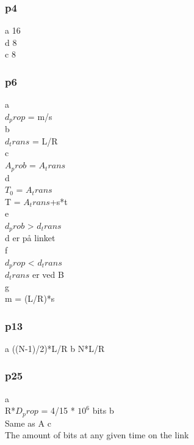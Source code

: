 \documentclass[a4paper,10pt,titlepage]{report}
\begin{document}
\subsubsection{p4}
a 16 \\
d 8 \\
c 8 \\

\subsubsection{p6}
a\\
$d_prop$ = m/s \\
\vspace{10mm}
b\\
$d_trans$ = L/R\\
\vspace{10mm}
c\\
$A_prob$ = $A_trans$\\
\vspace{10mm}
d\\
$T_0$ = $A_trans$\\
T = $A_trans$+s*t\\
\vspace{10mm}
e\\
$d_prob$ > $d_trans$\\
d er på linket\\
\vspace{10mm}
f\\
$d_prop$ < $d_trans$\\
$d_trans$ er ved B\\
\vspace{10mm}
g\\
m = (L/R)*s\\

\subsubsection{p13}
a
((N-1)/2)*L/R
b
N*L/R

\subsubsection{p25}
a\\
R*$D_prop$ = 4/15 * $10^6$ bits
\vspace{10mm}
b\\
Same as A
\vspace{10mm}
c\\
The amount of bits at any given time on the link
\end{document}
